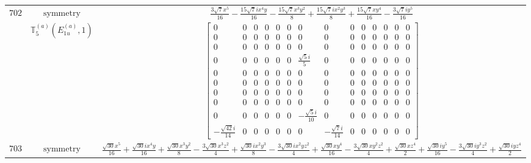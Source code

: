 \documentclass[fleqn,8pt,landscape]{jsarticle}
\begin{document}
\begin{longtable}{ccc}
$ 702 $ & $ \text{symmetry} $ & $ \frac{3 \sqrt{7} x^{5}}{16} - \frac{15 \sqrt{7} i x^{4} y}{16} - \frac{15 \sqrt{7} x^{3} y^{2}}{8} + \frac{15 \sqrt{7} i x^{2} y^{3}}{8} + \frac{15 \sqrt{7} x y^{4}}{16} - \frac{3 \sqrt{7} i y^{5}}{16} $ \\
$  $ & $ \mathbb{T}_{5}^{(a)}(E_{1u}^{(a)},1) $ & $ \begin{bmatrix} 0 & 0 & 0 & 0 & 0 & 0 & 0 & 0 & 0 & 0 & 0 & 0 & 0 & 0 \\ 0 & 0 & 0 & 0 & 0 & 0 & 0 & 0 & 0 & 0 & 0 & 0 & 0 & 0 \\ 0 & 0 & 0 & 0 & 0 & 0 & 0 & 0 & 0 & 0 & 0 & 0 & 0 & 0 \\ 0 & 0 & 0 & 0 & 0 & 0 & \frac{\sqrt{5} i}{5} & 0 & 0 & 0 & 0 & 0 & 0 & 0 \\ 0 & 0 & 0 & 0 & 0 & 0 & 0 & 0 & 0 & 0 & 0 & 0 & 0 & 0 \\ 0 & 0 & 0 & 0 & 0 & 0 & 0 & 0 & 0 & 0 & 0 & 0 & 0 & 0 \\ 0 & 0 & 0 & 0 & 0 & 0 & 0 & 0 & 0 & 0 & 0 & 0 & 0 & 0 \\ 0 & 0 & 0 & 0 & 0 & 0 & 0 & 0 & 0 & 0 & 0 & 0 & 0 & 0 \\ 0 & 0 & 0 & 0 & 0 & 0 & - \frac{\sqrt{5} i}{10} & 0 & 0 & 0 & 0 & 0 & 0 & 0 \\ - \frac{\sqrt{42} i}{14} & 0 & 0 & 0 & 0 & 0 & 0 & - \frac{\sqrt{7} i}{14} & 0 & 0 & 0 & 0 & 0 & 0 \end{bmatrix} $ \\ \hline
$ 703 $ & $ \text{symmetry} $ & $ \frac{\sqrt{30} x^{5}}{16} + \frac{\sqrt{30} i x^{4} y}{16} + \frac{\sqrt{30} x^{3} y^{2}}{8} - \frac{3 \sqrt{30} x^{3} z^{2}}{4} + \frac{\sqrt{30} i x^{2} y^{3}}{8} - \frac{3 \sqrt{30} i x^{2} y z^{2}}{4} + \frac{\sqrt{30} x y^{4}}{16} - \frac{3 \sqrt{30} x y^{2} z^{2}}{4} + \frac{\sqrt{30} x z^{4}}{2} + \frac{\sqrt{30} i y^{5}}{16} - \frac{3 \sqrt{30} i y^{3} z^{2}}{4} + \frac{\sqrt{30} i y z^{4}}{2} $ \\

\end{longtable}
\end{document}

